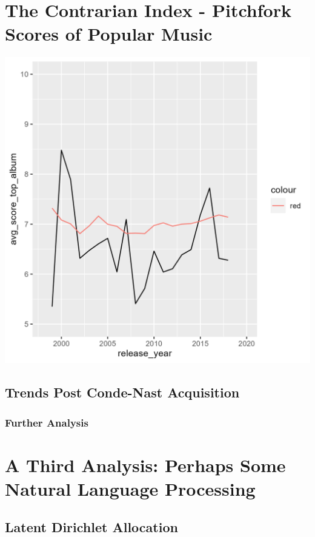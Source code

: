 \documentclass[a4paper,12pt]{article}
\begin{document}
\section{The Contrarian Index - Pitchfork Scores of Popular Music}
\includegraphics[width = \linewidth]{"figures/contrarian_index.png"}
\subsection{Trends Post Conde-Nast Acquisition}
\subsubsection{Further Analysis}

\section{A Third Analysis: Perhaps Some Natural Language Processing}
\subsection{Latent Dirichlet Allocation}
\end{document}
